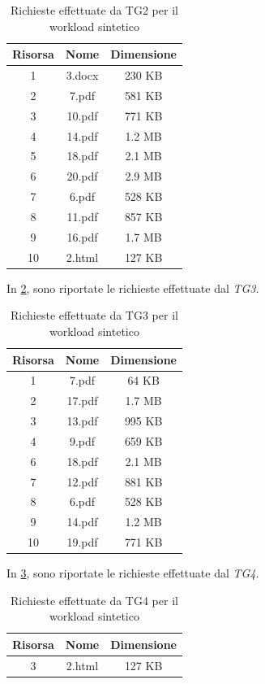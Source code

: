 \begin{table}[H]
\centering
    \begin{tabular}{|c|c|c|}
    \hline
    \multicolumn{1}{|c|}{\textbf{Risorsa}} &
    \multicolumn{1}{|c|}{\textbf{Nome}} &
    \multicolumn{1}{|c|}{\textbf{Dimensione}}
    \tabularnewline \hline

1 & 3.docx & 230 KB   \tabularnewline \hline
2 & 7.pdf & 581 KB  \tabularnewline \hline
3 & 10.pdf & 771 KB \tabularnewline \hline
4 & 14.pdf & 1.2 MB \tabularnewline \hline
5 & 18.pdf & 2.1 MB \tabularnewline \hline
6 & 20.pdf & 2.9 MB \tabularnewline \hline
7 & 6.pdf & 528 KB  \tabularnewline \hline
8 & 11.pdf & 857 KB \tabularnewline \hline
9 & 16.pdf & 1.7 MB \tabularnewline \hline
10 & 2.html & 127 KB \tabularnewline \hline
\end{tabular}
\caption{Richieste effettuate da TG2 per il workload sintetico}
\label{tab:tg2_synthetic}
\end{table}

In \cref{tab:tg3_synthetic}, sono riportate le richieste effettuate dal \textit{TG3}.

\begin{table}[H]
\centering
    \begin{tabular}{|c|c|c|}
    \hline
    \multicolumn{1}{|c|}{\textbf{Risorsa}} &
    \multicolumn{1}{|c|}{\textbf{Nome}} &
    \multicolumn{1}{|c|}{\textbf{Dimensione}}
    \tabularnewline \hline

1 & 7.pdf & 64 KB \tabularnewline \hline
2 & 17.pdf & 1.7 MB \tabularnewline \hline
3 & 13.pdf & 995 KB \tabularnewline \hline
4 & 9.pdf & 659 KB \tabularnewline \hline
6 & 18.pdf & 2.1 MB \tabularnewline \hline
7 & 12.pdf & 881 KB \tabularnewline \hline
8 & 6.pdf & 528 KB \tabularnewline \hline
9 & 14.pdf & 1.2 MB \tabularnewline \hline
10 & 19.pdf & 771 KB \tabularnewline \hline
\end{tabular}
\caption{Richieste effettuate da TG3 per il workload sintetico}
\label{tab:tg3_synthetic}
\end{table}

In \cref{tab:tg4_synthetic}, sono riportate le richieste effettuate dal \textit{TG4}.
\begin{table}[H]
\centering
    \begin{tabular}{|c|c|c|}
    \hline
    \multicolumn{1}{|c|}{\textbf{Risorsa}} &
    \multicolumn{1}{|c|}{\textbf{Nome}} &
    \multicolumn{1}{|c|}{\textbf{Dimensione}}
    \tabularnewline \hline

3 & 2.html & 127 KB  \tabularnewline \hline
\end{tabular}
\caption{Richieste effettuate da TG4 per il workload sintetico}
\label{tab:tg4_synthetic}
\end{table}


